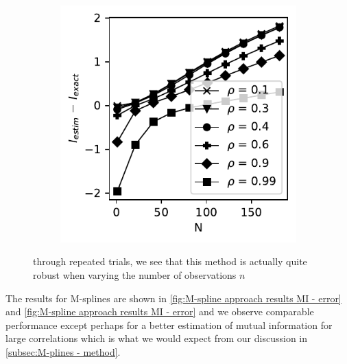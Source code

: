 \documentclass[../Thesis.tex]{subfiles}
\begin{document}
\begin{figure}[H]
\begin{subfigure}[t]{0.4\textwidth}
        \includegraphics[width=\linewidth]{figures/ND examples/MI calc/gaussian example original high corr - B-spline - error.pdf}
        \caption{}
    \end{subfigure}
    \caption{through repeated trials, we see that this method is actually quite robust when varying the number of observations $n$}
    \label{fig:B-spline approach results MI - error}
\end{figure}
The results for M-splines are shown in \autoref{fig:M-spline approach results MI - error} and \autoref{fig:M-spline approach results MI - error} and we observe comparable performance except perhaps for a better estimation of mutual information for large correlations which is what we would expect from our discussion in \autoref{subsec:M-plines - method}.
\end{document}
